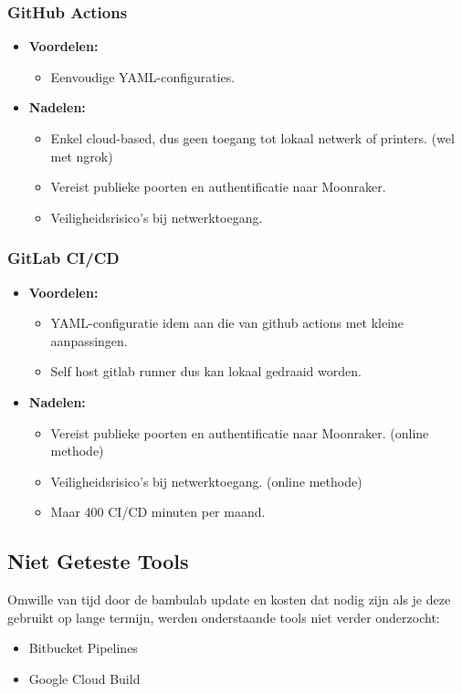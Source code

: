 \subsubsection{GitHub Actions}
\begin{itemize}
    \item \textbf{Voordelen:}
    \begin{itemize}
        \item Eenvoudige YAML-configuraties.
    \end{itemize}
    \item \textbf{Nadelen:}
    \begin{itemize}
        \item Enkel cloud-based, dus geen toegang tot lokaal netwerk of printers. (wel met ngrok)
        \item Vereist publieke poorten en authentificatie naar Moonraker.
        \item Veiligheidsrisico’s bij netwerktoegang.
    \end{itemize}
\end{itemize}

\subsubsection{GitLab CI/CD}
\begin{itemize}
    \item \textbf{Voordelen:}
    \begin{itemize}
        \item YAML-configuratie idem aan die van github actions met kleine aanpassingen.
        \item Self host gitlab runner dus kan lokaal gedraaid worden.
    \end{itemize}
    \item \textbf{Nadelen:}
    \begin{itemize}
        \item Vereist publieke poorten en authentificatie naar Moonraker. (online methode)
        \item Veiligheidsrisico’s bij netwerktoegang. (online methode)
        \item Maar 400 CI/CD minuten per maand.
    \end{itemize}
\end{itemize}

\subsection{Niet Geteste Tools}
Omwille van tijd door de bambulab update en kosten dat nodig zijn als je deze gebruikt op lange termijn, werden onderstaande tools niet verder onderzocht:
\begin{itemize}
    \item Bitbucket Pipelines
    \item Google Cloud Build
\end{itemize}

